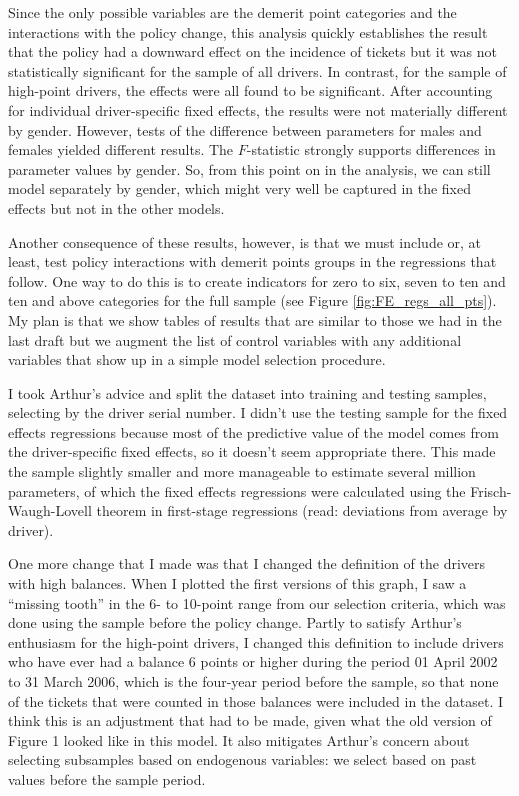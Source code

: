 \documentclass[12pt]{paper}
\begin{document}
Since the only possible variables are the demerit point categories and the interactions with the policy change, 
this analysis quickly establishes the result that 
the policy had a downward effect on the incidence of tickets but it was not statistically significant for the sample of all drivers.
In contrast, for the sample of high-point drivers, the effects were all found to be significant.
After accounting for individual driver-specific fixed effects, 
the results were not materially different by gender. 
%
However, tests of the difference between parameters for males and females yielded different results. 
The $F$-statistic strongly supports differences in parameter values by gender. 
So, from this point on in the analysis, we can still model separately by gender, 
which might very well be captured in the fixed effects
but not in the other models. 
%

Another consequence of these results, however, is that we must include or, at least, test policy interactions with demerit points groups in the regressions that follow. 
One way to do this is to create indicators for zero to six, seven to ten and ten and above categories for the full sample (see Figure \ref{fig:FE_regs_all_pts}). 
My plan is that we show tables of results that are similar to those we had in the last draft 
but we augment the list of control variables with any additional variables that show up in a simple model selection procedure. 


I took Arthur's advice and split the dataset into training and testing samples, selecting by the driver serial number.  
I didn't use the testing sample for the fixed effects regressions because most of the predictive value of the model comes from the driver-specific fixed effects, so it doesn't seem appropriate there. 
This made the sample slightly smaller and more manageable to estimate several million parameters, of which the fixed effects regressions were calculated using the Frisch-Waugh-Lovell theorem in first-stage regressions (read: deviations from average by driver). 

One more change that I made was that I changed the definition of the drivers with high balances. 
When I plotted the first versions of this graph, I saw a ``missing tooth'' in the 6- to 10-point range from our selection criteria, which was done using the sample before the policy change. 
Partly to satisfy Arthur's enthusiasm for the high-point drivers, I changed this definition to include drivers who have ever had a balance 6 points or higher during the period 01 April 2002 to 31 March 2006, which is the four-year period before the sample,  so that none of the tickets that were counted in those balances were included in the dataset. 
I think this is an adjustment that had to be made, given what the old version of Figure 1 looked like in this model. 
It also mitigates Arthur's concern about selecting subsamples based on endogenous variables:
we select based on past values before the sample period. 
\end{document}

